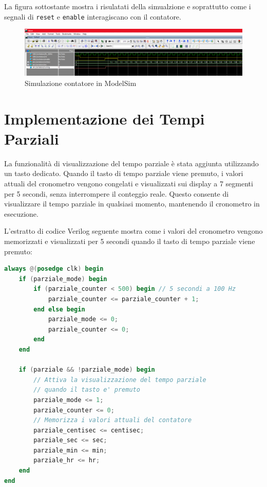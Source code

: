 \documentclass{article}
\begin{document}
La figura sottostante mostra i risulatati della simualzione e soprattutto come i segnali di \texttt{reset} e \texttt{enable} interagiscano con il contatore.

\vspace{1em}

\begin{figure}[!ht]
    \centering
    \includegraphics[width=\linewidth]{Immagini/Simulazione_Contatore.png}
    \caption{Simulazione contatore in ModelSim}
    \label{fig: Simulazione_Contatore}
\end{figure}

\newpage

\section{Implementazione dei Tempi Parziali}
La funzionalità di visualizzazione del tempo parziale è stata aggiunta utilizzando un tasto dedicato. Quando il tasto di tempo parziale viene premuto, i valori attuali del cronometro vengono congelati e visualizzati sui display a 7 segmenti per 5 secondi, senza interrompere il conteggio reale. Questo consente di visualizzare il tempo parziale in qualsiasi momento, mantenendo il cronometro in esecuzione.

L'estratto di codice Verilog seguente mostra come i valori del cronometro vengono memorizzati e visualizzati per 5 secondi quando il tasto di tempo parziale viene premuto:

\begin{lstlisting}[language=Verilog, caption={Gestione del Tempo Parziale}]
always @(posedge clk) begin
    if (parziale_mode) begin
        if (parziale_counter < 500) begin // 5 secondi a 100 Hz
            parziale_counter <= parziale_counter + 1;
        end else begin
            parziale_mode <= 0;
            parziale_counter <= 0;
        end
    end

    if (parziale && !parziale_mode) begin
        // Attiva la visualizzazione del tempo parziale 
        // quando il tasto e' premuto
        parziale_mode <= 1;
        parziale_counter <= 0;
        // Memorizza i valori attuali del contatore
        parziale_centisec <= centisec;
        parziale_sec <= sec;
        parziale_min <= min;
        parziale_hr <= hr;
    end
end
\end{lstlisting}
\end{document}
